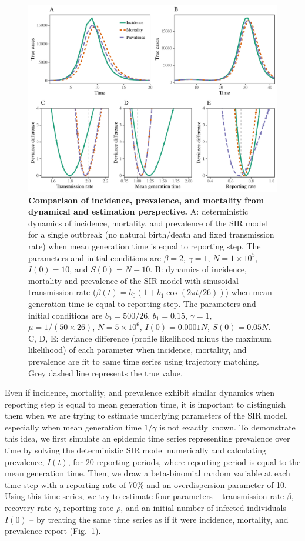 \documentclass{article}
\newcommand{\fref}[1]{Fig.~\ref{fig:#1}}
\begin{document}
\begin{figure}[!ht]
\includegraphics[width=\textwidth]{../figure/compare_profile_likelihood.pdf}
\caption{
\textbf{Comparison of incidence, prevalence, and mortality from dynamical and estimation perspective.}
A: deterministic dynamics of incidence, mortality, and prevalence of the SIR model for a single outbreak (no natural birth/death and fixed transmission rate) when mean generation time is equal to reporting step.
The parameters and initial conditions are $\beta = 2$, $\gamma = 1$, $N = 1 \times 10^5$, $I(0) = 10$, and $S(0) = N - 10$.
B: dynamics of incidence, mortality and prevalence of the SIR model with sinusoidal transmission rate ($\beta(t) = b_0 (1 + b_1 \cos (2 \pi t/26))$) when mean generation time ie equal to reporting step.
The parameters and initial conditions are $b_0 = 500/26$, $b_1 = 0.15$, $\gamma = 1$, $\mu = 1/(50 \times 26)$, $N = 5 \times 10^6$, $I(0) = 0.0001 N$, $S(0) = 0.05 N$.
C, D, E: deviance difference (profile likelihood minus the maximum likelihood) of each parameter when incidence, mortality, and prevalence are fit to same time series using trajectory matching. 
Grey dashed line represents the true value.
} 
\label{fig:incidence}
\end{figure}

Even if incidence, mortality, and prevalence exhibit similar dynamics when reporting step is equal to mean generation time, it is important to distinguish them when we are trying to estimate underlying parameters of the SIR model, especially when mean generation time $1/\gamma$ is not exactly known.
To demonstrate this idea, we first simulate an epidemic time series representing prevalence over time by solving the deterministic SIR model numerically and calculating prevalence, $I(t)$, for 20 reporting periods, where reporting period is equal to the mean generation time. Then, we draw a beta-binomial random variable at each time step with a reporting rate of 70\% and an overdispersion parameter of 10.
Using this time series, we try to estimate four parameters -- transmission rate $\beta$, recovery rate $\gamma$, reporting rate $\rho$, and an initial number of infected individuals $I(0)$ -- by treating the same time series as if it were incidence, mortality, and prevalence report (\fref{incidence}).
\end{document}
